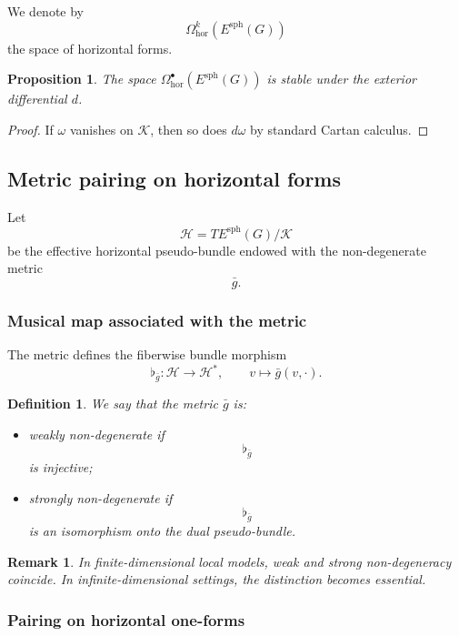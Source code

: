 \documentclass[11pt]{amsart}
\newtheorem{proposition}[theorem]{Proposition}
\newtheorem{definition}[theorem]{Definition}
\newtheorem{remark}[theorem]{Remark}
\begin{document}
We denote by
\[
\Omega^k_{\mathrm{hor}}(E^{\mathrm{sph}}(G))
\]
the space of horizontal forms.

\begin{proposition}
The space $\Omega^\bullet_{\mathrm{hor}}(E^{\mathrm{sph}}(G))$ is stable under the exterior differential $d$.
\end{proposition}

\begin{proof}
If $\omega$ vanishes on $\mathcal K$, then so does $d\omega$ by standard Cartan calculus.
\end{proof}

\subsection{Metric pairing on horizontal forms}

Let
\[
\mathcal H
=
TE^{\mathrm{sph}}(G)/\mathcal K
\]
be the effective horizontal pseudo-bundle endowed with the non-degenerate
metric
\[
\bar g.
\]

\subsubsection{Musical map associated with the metric}

The metric defines the fiberwise bundle morphism
\[
\flat_{\bar g}:
\mathcal H
\longrightarrow
\mathcal H^*,
\qquad
v\mapsto \bar g(v,\cdot).
\]

\begin{definition}
We say that the metric \(\bar g\) is:
\begin{itemize}
\item weakly non-degenerate if
\[
\flat_{\bar g}
\]
is injective;
\item strongly non-degenerate if
\[
\flat_{\bar g}
\]
is an isomorphism onto the dual pseudo-bundle.
\end{itemize}
\end{definition}

\begin{remark}
In finite-dimensional local models, weak and strong non-degeneracy coincide.
In infinite-dimensional settings, the distinction becomes essential.
\end{remark}

\subsubsection{Pairing on horizontal one-forms}
\end{document}
